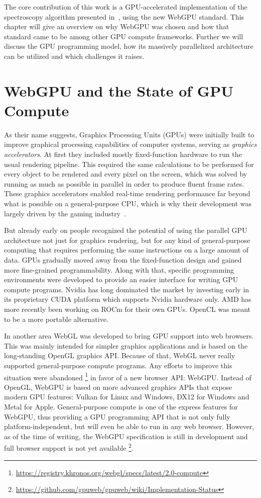 The core contribution of this work is a GPU-accelerated implementation of the
spectroscopy algorithm presented in~\cite{bisping2023process},
using the new WebGPU standard.
This chapter will give an overview on why WebGPU was chosen and how that
standard came to be among other GPU compute frameworks.
Further we will discuss the GPU programming model,
how its massively parallelized architecture can be utilized
and which challenges it raises.

\section{WebGPU and the State of GPU Compute}

As their name suggests, Graphics Processing Units (GPUs) were initially built
to improve graphical processing capabilities of computer systems,
serving as \emph{graphics accelerators}.
At first they included mostly fixed-function hardware to run the usual
rendering pipeline.
This required the same calculations to be performed for every object to
be rendered and every pixel on the screen,
which was solved by running as much as possible in parallel in order to produce
fluent frame rates.
These graphics accelerators enabled real-time rendering performance far beyond
what is possible on a general-purpose CPU,
which is why their development was largely driven
by the gaming industry~\cite{Patterson2016}.

But already early on people recognized the potential of using the parallel
GPU architecture not just for graphics rendering,
but for any kind of general-purpose computing that requires performing the same
instructions on a large amount of data.
GPUs gradually moved away from the fixed-function design and gained more
fine-grained programmability.
Along with that, specific programming environments were
developed to provide an easier interface for writing GPU compute programs.
Nvidia has long dominated the market by investing early in its
proprietary CUDA platform which supports Nvidia hardware only.
AMD has more recently been working on ROCm for their own GPUs.
OpenCL was meant to be a more portable alternative.

In another area WebGL was developed to bring GPU support into web browsers.
This was mainly intended for simpler graphics applications and is based on the
long-standing OpenGL graphics API\@.
Because of that, WebGL never really supported general-purpose compute programs.
Any efforts to improve this situation were abandoned%
\footnote{\url{https://registry.khronos.org/webgl/specs/latest/2.0-compute}}
in favor of a new browser API\@: WebGPU\@.
Instead of OpenGL, WebGPU is based on more advanced graphics APIs
that expose modern GPU features:
Vulkan for Linux and Windows, DX12 for Windows and Metal for Apple.
General-purpose compute is one of the express features for WebGPU,
thus providing a GPU programming API that is not only fully
platform-independent, but will even be able to run in any web browser.
However, as of the time of writing, the WebGPU specification is still in
development and full browser support is not yet available%
\footnote{\url{https://github.com/gpuweb/gpuweb/wiki/Implementation-Status}}.

